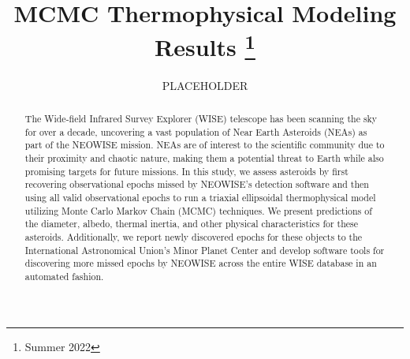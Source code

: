 \documentclass[linenumbers]{aastex631}
\begin{document}
\title{MCMC Thermophysical Modeling Results \footnote{Summer 2022}}
\author{PLACEHOLDER}
\begin{abstract}
The Wide-field Infrared Survey Explorer (WISE) telescope has been scanning the sky for over a decade, uncovering a vast population of Near Earth Asteroids (NEAs) as part of the NEOWISE mission. NEAs are of interest to the scientific community due to their proximity and chaotic nature, making them a potential threat to Earth while also promising targets for future missions. In this study, we assess asteroids by first recovering observational epochs missed by NEOWISE’s detection software and then using all valid observational epochs to run a triaxial ellipsoidal thermophysical model utilizing Monte Carlo Markov Chain (MCMC) techniques. We present predictions of the diameter, albedo, thermal inertia, and other physical characteristics for these asteroids. Additionally, we report newly discovered epochs for these objects to the International Astronomical Union’s Minor Planet Center and develop software tools for discovering more missed epochs by NEOWISE across the entire WISE database in an automated fashion.
\end{abstract}
\end{document}
